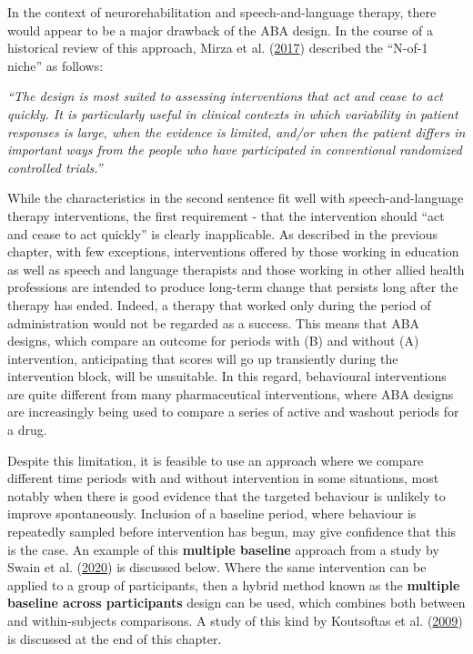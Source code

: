 \documentclass{krantz}
\begin{document}
In the context of neurorehabilitation and speech-and-language therapy, there would appear to be a major drawback of the ABA design. In the course of a historical review of this approach, Mirza et al. (\protect\hyperlink{ref-mirza2017}{2017}) described the ``N-of-1 niche'' as follows:

\emph{``The design is most suited to assessing interventions that act and cease to act quickly. It is particularly useful in clinical contexts in which variability in patient responses is large, when the evidence is limited, and/or when the patient differs in important ways from the people who have participated in conventional randomized controlled trials.''}

While the characteristics in the second sentence fit well with speech-and-language therapy interventions, the first requirement - that the intervention should ``act and cease to act quickly'' is clearly inapplicable. As described in the previous chapter, with few exceptions, interventions offered by those working in education as well as speech and language therapists and those working in other allied health professions are intended to produce long-term change that persists long after the therapy has ended. Indeed, a therapy that worked only during the period of administration would not be regarded as a success. This means that ABA designs, which compare an outcome for periods with (B) and without (A) intervention, anticipating that scores will go up transiently during the intervention block, will be unsuitable. In this regard, behavioural interventions are quite different from many pharmaceutical interventions, where ABA designs are increasingly being used to compare a series of active and washout periods for a drug.

Despite this limitation, it is feasible to use an approach where we compare different time periods with and without intervention in some situations, most notably when there is good evidence that the targeted behaviour is unlikely to improve spontaneously. Inclusion of a baseline period, where behaviour is repeatedly sampled before intervention has begun, may give confidence that this is the case. An example of this \textbf{multiple baseline} approach from a study by Swain et al. (\protect\hyperlink{ref-swain2020}{2020}) is discussed below. Where the same intervention can be applied to a group of participants, then a hybrid method known as the \textbf{multiple baseline across participants} design can be used, which combines both between and within-subjects comparisons. A study of this kind by Koutsoftas et al. (\protect\hyperlink{ref-koutsoftas2009}{2009}) is discussed at the end of this chapter.
\end{document}
